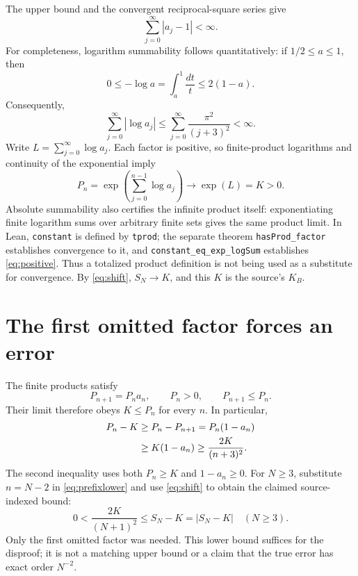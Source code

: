 \documentclass[10pt,letterpaper]{article}
\begin{document}
The upper bound and the convergent reciprocal-square series give
\[
\sum_{j=0}^{\infty}|a_j-1|<\infty.
\]
For completeness, logarithm summability follows quantitatively: if $1/2\le a\le1$, then
\[
0\le-\log a=\int_a^1\frac{dt}{t}\le2(1-a).
\]
Consequently,
\[
\sum_{j=0}^{\infty}|\log a_j|
\le\sum_{j=0}^{\infty}\frac{\pi^2}{(j+3)^2}<\infty.
\]
Write $L=\sum_{j=0}^{\infty}\log a_j$. Each factor is positive, so finite-product logarithms and continuity of the exponential imply
\begin{equation}\label{eq:positive}
P_n=\exp\left(\sum_{j=0}^{n-1}\log a_j\right)
\longrightarrow \exp(L)=K>0.
\end{equation}
Absolute summability also certifies the infinite product itself: exponentiating finite logarithm sums over arbitrary finite sets gives the same product limit. In Lean, \texttt{constant} is defined by \texttt{tprod}; the separate theorem \texttt{hasProd\_factor} establishes convergence to it, and \texttt{constant\_eq\_exp\_logSum} establishes \eqref{eq:positive}. Thus a totalized product definition is not being used as a substitute for convergence. By \eqref{eq:shift}, $S_N\to K$, and this $K$ is the source's $K_B$.

\section{The first omitted factor forces an error}
The finite products satisfy
\[
P_{n+1}=P_n a_n,\qquad P_n>0,\qquad P_{n+1}\le P_n.
\]
Their limit therefore obeys $K\le P_n$ for every $n$. In particular,
\begin{align}
P_n-K
&\ge P_n-P_{n+1}=P_n(1-a_n)\notag\\
&\ge K(1-a_n)\ge\frac{2K}{(n+3)^2}.\label{eq:prefixlower}
\end{align}
The second inequality uses both $P_n\ge K$ and $1-a_n\ge0$. For $N\ge3$, substitute $n=N-2$ in \eqref{eq:prefixlower} and use \eqref{eq:shift} to obtain the claimed source-indexed bound:
\begin{equation}\label{eq:errorlower}
\boxed{\quad 0<\frac{2K}{(N+1)^2}\le S_N-K=|S_N-K|\quad(N\ge3).\quad}
\end{equation}
Only the first omitted factor was needed. This lower bound suffices for the disproof; it is not a matching upper bound or a claim that the true error has exact order $N^{-2}$.
\end{document}
